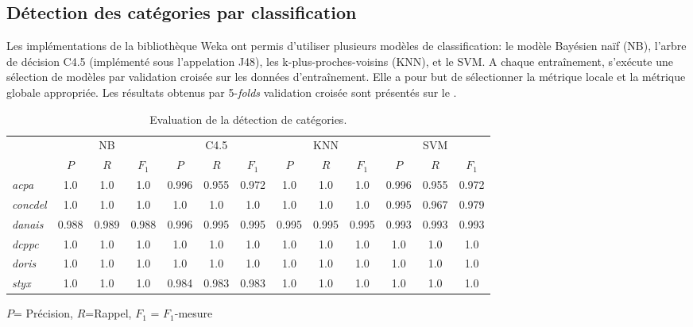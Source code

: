 \subsection{Détection des catégories par classification}
Les implémentations de la bibliothèque Weka \citep{frank2016weka} ont permis d'utiliser plusieurs modèles de classification: le modèle Bayésien naïf (NB), l'arbre de décision C4.5 (implémenté sous l'appelation J48), les k-plus-proches-voisins (KNN), et le SVM. 
 A chaque entraînement, s'exécute une sélection de modèles par validation croisée sur les données d'entraînement. Elle a pour but de sélectionner la métrique locale et la métrique globale appropriée. Les résultats obtenus par 5-\textit{folds} validation croisée sont présentés sur le . 
 
\begin{table}[!h]
	\scriptsize
	\begin{center}
	\begin{tabular}{l|ccc|ccc|ccc|ccc}
		\hline\noalign{\smallskip}
		& \multicolumn{3}{|c|}{NB} & \multicolumn{3}{|c|}{C4.5} & \multicolumn{3}{|c|}{KNN} & \multicolumn{3}{|c}{SVM} \\ 
		\noalign{\smallskip}
		\hline
		\noalign{\smallskip}
		& $P$ & $R$ & $F_1$ & $P$ & $R$ & $F_1$ & $P$ & $R$ & $F_1$ & $P$ & $R$ & $F_1$ \\ 
		\noalign{\smallskip}
		\hline
		\noalign{\smallskip}
		\textit{acpa} & 1.0 & 1.0 & 1.0 & 0.996 & 0.955 & 0.972 & 1.0 & 1.0 & 1.0 & 0.996 & 0.955 & 0.972 \\
		\textit{concdel} & 1.0 & 1.0 & 1.0 & 1.0 & 1.0 & 1.0 & 1.0 & 1.0 & 1.0 & 0.995 & 0.967 & 0.979 \\
		\textit{danais} & 0.988 & 0.989 & 0.988 & 0.996 & 0.995 & 0.995 & 0.995 & 0.995 & 0.995 & 0.993 & 0.993 & 0.993 \\
		\textit{dcppc} & 1.0 & 1.0 & 1.0 & 1.0 & 1.0 & 1.0 & 1.0 & 1.0 & 1.0 & 1.0 & 1.0 & 1.0 \\
		\textit{doris} & 1.0 & 1.0 & 1.0 & 1.0 & 1.0 & 1.0 & 1.0 & 1.0 & 1.0 & 1.0 & 1.0 & 1.0 \\
		\textit{styx} & 1.0 & 1.0 & 1.0 & 0.984 & 0.983 & 0.983 & 1.0 & 1.0 & 1.0 & 1.0 & 1.0 & 1.0 \\
		\hline
	\end{tabular}
\end{center}

$P$= Précision, $R$=Rappel, $F_1$ = $F_1$-mesure
	\caption{Evaluation de la détection de catégories.}\label{tab:quanta:resultat-detect-cat}
\end{table}

